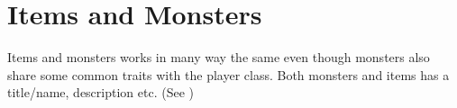 \section{Items and Monsters}

Items and monsters works in many way the same even though monsters also share some common traits with the player class.
Both monsters and items has a title/name, description etc. (See )

